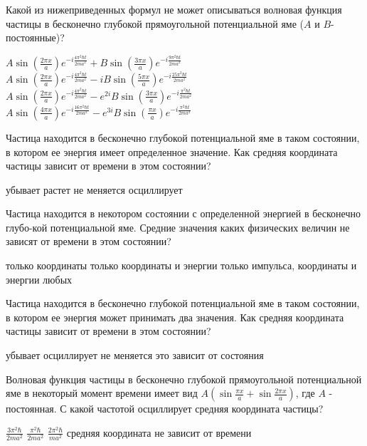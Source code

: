 \documentclass[11pt,a4paper]{exam}
\begin{document}
\begin{questions}
\question Какой из нижеприведенных формул не может описываться волновая функция частицы в бесконечно глубокой прямоугольной потенциальной яме ($A$ и $B$- постоянные)? 
\begin{choices}
\choice $A\sin \left( {\frac{{2\pi x}}{a}} \right){e^{ - i\frac{{4{\pi ^2}\hbar t}}{{2m{a^2}}}}} + B\sin \left( {\frac{{3\pi x}}{a}} \right){e^{ - i\frac{{9{\pi ^2}\hbar t}}{{2m{a^2}}}}}$    
\choice $A\sin \left( {\frac{{2\pi x}}{a}} \right){e^{ - i\frac{{4{\pi ^2}\hbar t}}{{2m{a^2}}}}} - iB\sin \left( {\frac{{5\pi x}}{a}} \right){e^{ - i\frac{{25{\pi ^2}\hbar t}}{{2m{a^2}}}}}$
\choice $A\sin \left( {\frac{{2\pi x}}{a}} \right){e^{ - i\frac{{4{\pi ^2}\hbar t}}{{2m{a^2}}}}} - {e^{2i}}B\sin \left( {\frac{{3\pi x}}{a}} \right){e^{ - i\frac{{{\pi ^2}\hbar t}}{{2m{a^2}}}}}$   
\choice $A\sin \left( {\frac{{4\pi x}}{a}} \right){e^{ - i\frac{{16{\pi ^2}\hbar t}}{{2m{a^2}}}}} - {e^{3i}}B\sin \left( {\frac{{\pi x}}{a}} \right){e^{ - i\frac{{{\pi ^2}\hbar t}}{{2m{a^2}}}}}$
\end{choices}

\question Частица находится в бесконечно глубокой потенциальной яме в таком состоянии, в котором ее энергия имеет определенное значение. Как средняя координата частицы зависит от времени в этом состоянии?
\begin{choices}
\choice убывает     
\choice растет      
\choice не меняется    
\choice осциллирует
\end{choices}

\question Частица находится в некотором состоянии с определенной энергией в бесконечно глубо-кой потенциальной яме. Средние значения каких физических величин не зависят от времени в этом состоянии?
\begin{choices}
\choice только координаты
\choice только координаты и энергии
\choice только импульса, координаты и энергии
\choice любых
\end{choices}

\question Частица находится в бесконечно глубокой потенциальной яме в таком состоянии, в котором ее энергия может принимать два значения. Как средняя координата частицы зависит от времени в этом состоянии?
\begin{choices}
\choice убывает           
\choice осциллирует
\choice не меняется       
\choice это зависит от состояния
\end{choices}

\question Волновая функция частицы в бесконечно глубокой прямоугольной потенциальной яме в некоторый момент времени имеет вид $A\left( {\sin \frac{{\pi x}}{a} + \sin \frac{{2\pi x}}{a}} \right)$, где $A$ - постоянная. С какой частотой осциллирует средняя координата частицы?
\begin{choices}
\choice $\frac{{3{\pi ^2}\hbar }}{{2m{a^2}}}$  
\choice $\frac{{{\pi ^2}\hbar }}{{2m{a^2}}}$   
\choice $\frac{{2{\pi ^2}\hbar }}{{m{a^2}}}$   
\choice средняя координата не зависит от времени
\end{choices}


\end{questions}
\end{document}
